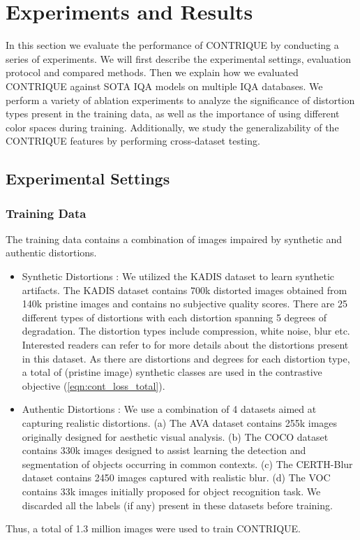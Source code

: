 \documentclass[journal]{IEEEtran}
\begin{document}
\section{Experiments and Results}
\label{sec:experiments}
In this section we evaluate the performance of CONTRIQUE by conducting a series of experiments. We will first describe the experimental settings, evaluation protocol and compared methods. Then we explain how we evaluated CONTRIQUE against SOTA IQA models on multiple IQA databases. We perform a variety of ablation experiments to analyze the significance of distortion types present in the training data, as well as the importance of using different color spaces during training. Additionally, we study the generalizability of the CONTRIQUE features by performing cross-dataset testing.

\subsection{Experimental Settings}
\subsubsection*{\textbf{Training Data}}
The training data contains a combination of images impaired by synthetic and authentic distortions.
\begin{itemize}
    \item Synthetic Distortions : We utilized the KADIS dataset \cite{lin2020deepfl} to learn synthetic artifacts. The KADIS dataset contains 700k distorted images obtained from 140k pristine images and contains no subjective quality scores. There are 25 different types of distortions with each distortion spanning 5 degrees of degradation. The distortion types include compression, white noise, blur etc. Interested readers can refer to \cite{lin2020deepfl} for more details about the distortions present in this dataset. As there are  distortions and  degrees for each distortion type, a total of  (pristine image)  synthetic classes are used in the contrastive objective (\ref{eqn:cont_loss_total}).
    \item Authentic Distortions : We use a combination of 4 datasets aimed at capturing realistic distortions. (a) The AVA dataset \cite{murray2012ava} contains 255k images originally designed for aesthetic visual analysis. (b) The COCO dataset \cite{lin2014microsoft} contains 330k images designed to assist learning the detection and segmentation of objects occurring in common contexts. (c) The CERTH-Blur dataset \cite{mavridaki2014no} contains 2450 images captured with realistic blur. (d) The VOC \cite{everingham2010pascal} contains 33k images initially proposed for object recognition task. We discarded all the labels (if any) present in these datasets before training. 
\end{itemize}
Thus, a total of 1.3 million images were used to train CONTRIQUE.\\
\end{document}
